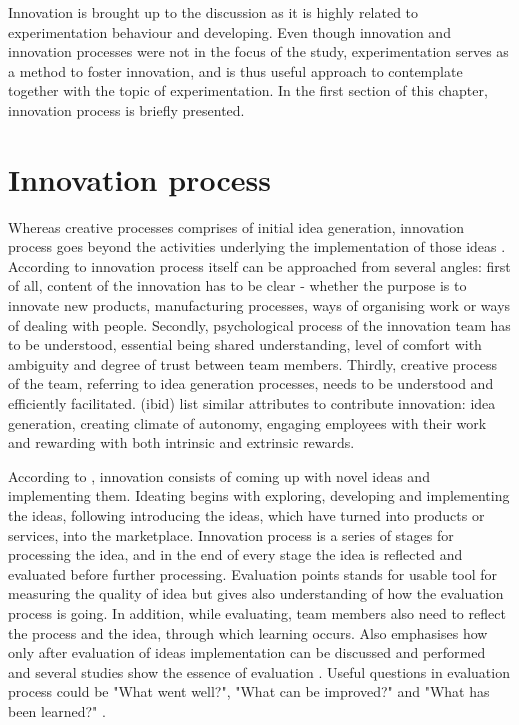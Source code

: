 Innovation is brought up to the discussion as it is highly related to experimentation behaviour and developing. Even though innovation and innovation processes were not in the focus of the study, experimentation serves as a method to foster innovation, and is thus useful approach to contemplate together with the topic of experimentation. In the first section of this chapter, innovation process is briefly presented. 

\section{Innovation process}
Whereas creative processes comprises of initial idea generation, innovation process goes beyond the activities underlying the implementation of those ideas \citep{vincent2002divergent}. According to \citet{buijs2007innovation} innovation process itself can be approached from several angles: first of all, content of the innovation has to be clear - whether the purpose is to innovate new products, manufacturing processes, ways of organising work or ways of dealing with people. Secondly, psychological process of the innovation team has to be understood, essential being shared understanding, level of comfort with ambiguity and degree of trust between team members. Thirdly, creative process of the team, referring to idea generation processes, needs to be understood and efficiently facilitated. (ibid) \citet{amabile1996assessing} list similar attributes to contribute innovation: idea generation, creating climate of autonomy, engaging employees with their work and rewarding with both intrinsic and extrinsic rewards. 

According to \citet{buijs2007innovation}, innovation consists of coming up with novel ideas and implementing them. Ideating begins with exploring, developing and implementing the ideas, following introducing the ideas, which have turned into products or services, into the marketplace. Innovation process is a series of stages for processing the idea, and in the end of every stage the idea is reflected and evaluated before further processing. Evaluation points stands for usable tool for measuring the quality of idea but gives also understanding of how the evaluation process is going. In addition, while evaluating, team members also need to reflect the process and the idea, through which learning occurs. Also \citep{runco1994problem} emphasises how only after evaluation of ideas implementation can be discussed and performed and several studies show the essence of evaluation \citep{mumford2002leading,vincent2002divergent}. Useful questions in evaluation process could be "What went well?", "What can be improved?" and "What has been learned?" \citep{buijs2007innovation}. 

